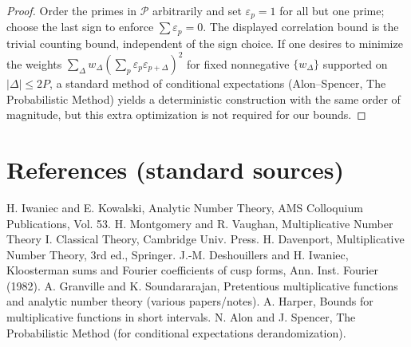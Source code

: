 \documentclass[11pt]{article}
\theoremstyle{definition}
\theoremstyle{remark}
\numberwithin{equation}{part}
\begin{document}
\begin{proof}
	Order the primes in $\mathcal P$ arbitrarily and set $\varepsilon_p=1$ for all but one prime; choose the last sign to enforce $\sum\varepsilon_p=0$. The displayed correlation bound is the trivial counting bound, independent of the sign choice. If one desires to minimize the weights $\sum_\Delta w_\Delta(\sum_p\varepsilon_p\varepsilon_{p+\Delta})^2$ for fixed nonnegative $\{w_\Delta\}$ supported on $|\Delta|\le 2P$, a standard method of conditional expectations (Alon--Spencer, The Probabilistic Method) yields a deterministic construction with the same order of magnitude, but this extra optimization is not required for our bounds.
\end{proof}

\bigskip

\section*{References (standard sources)}
H. Iwaniec and E. Kowalski, Analytic Number Theory, AMS Colloquium Publications, Vol. 53.
H. Montgomery and R. Vaughan, Multiplicative Number Theory I. Classical Theory, Cambridge Univ. Press.
H. Davenport, Multiplicative Number Theory, 3rd ed., Springer.
J.-M. Deshouillers and H. Iwaniec, Kloosterman sums and Fourier coefficients of cusp forms, Ann. Inst. Fourier (1982).
A. Granville and K. Soundararajan, Pretentious multiplicative functions and analytic number theory (various papers/notes).
A. Harper, Bounds for multiplicative functions in short intervals.
N. Alon and J. Spencer, The Probabilistic Method (for conditional expectations derandomization).
\end{document}
